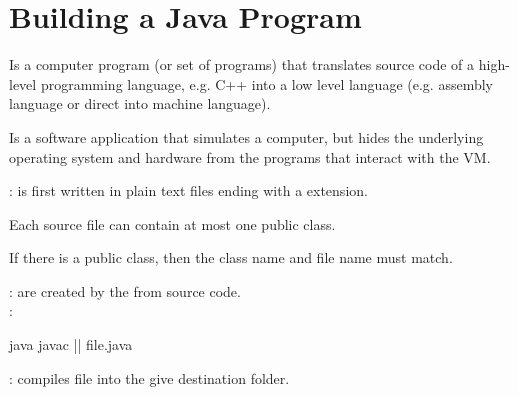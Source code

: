 \section{Building a Java Program}
\begin{defnbox}\nospacing
  \begin{defn}[Compiler]
    Is a computer program (or set of programs) that translates source code of a high-level programming language, e.g. C++ into a low level language (e.g. assembly language or direct into machine language).
  \end{defn}
\end{defnbox}
\begin{defnbox}\nospacing
  \begin{defn}
    Is a software application that simulates a computer, but hides the underlying operating system and hardware from the programs that
    interact with the VM.
  \end{defn}
\end{defnbox}
\begin{sectionbox}\nospacing
\begin{itemizenosep}
    \item {} : is first written in plain
    text files ending with a  extension.\\
  \begin{numberlist}
      \item Each source file can contain at most one public class.
      \item If there is a public class, then the class name and file name must match.
  \end{numberlist}
    \item {} : are created by the   from
  source code.\\
  :
  \begin{mintlinebox}{java}
		javac || file.java
  \end{mintlinebox}
\end{itemizenosep}  
\end{sectionbox}
\begin{sectionbox}\nospacing
  \begin{itemizenosep}
      \item {}: compiles file into the give
    destination folder.
  \end{itemizenosep}
\end{sectionbox}
